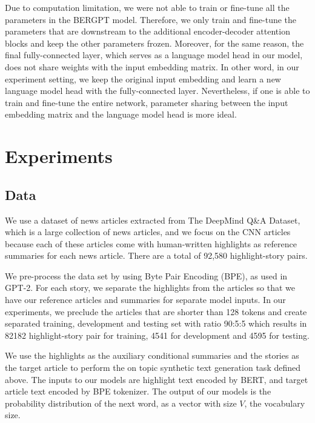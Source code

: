 \documentclass{article}
\begin{document}
Due to computation limitation, we were not able to train or fine-tune all the parameters in the BERGPT model. Therefore, we only train and fine-tune the parameters that are downstream to the additional encoder-decoder attention blocks and keep the other parameters frozen. Moreover, for the same reason, the final fully-connected layer, which serves as a language model head in our model, does not share weights with the input embedding matrix. In other word, in our experiment setting, we keep the original input embedding and learn a new language model head with the fully-connected layer. Nevertheless, if one is able to train and fine-tune the entire network, parameter sharing between the input embedding matrix and the language model head is more ideal.






\section{Experiments}

\subsection{Data}

We use a dataset of news articles extracted from The DeepMind Q\&A Dataset\cite{cnndailymail}, which is a large collection of news articles, and we focus on the CNN articles because each of these articles come with human-written highlights as reference summaries for each news article. There are a total of 92,580 highlight-story pairs.

We pre-process the data set by using Byte Pair Encoding (BPE)\cite{bpe}, as used in GPT-2. For each story, we separate the highlights from the articles so that we have our reference articles and summaries for separate model inputs. In our experiments, we preclude the articles that are shorter than 128 tokens and create separated training, development and testing set with ratio 90:5:5 which results in 82182 highlight-story pair for training, 4541 for development and 4595 for testing.

We use the highlights as the auxiliary conditional summaries and the stories as the target article to perform the on topic synthetic text generation task defined above. The inputs to our models are highlight text encoded by BERT, and target article text encoded by BPE tokenizer. The output of our models is the probability distribution of the next word, as a vector with size $V$, the vocabulary size.
\end{document}
